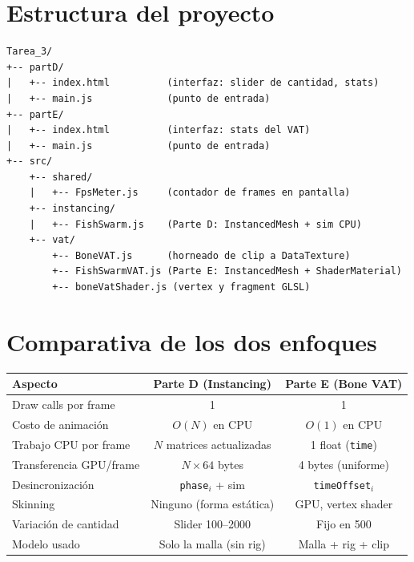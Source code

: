 \documentclass[12pt,a4paper]{article}
\begin{document}
\section{Estructura del proyecto}

\begin{verbatim}
Tarea_3/
+-- partD/
|   +-- index.html          (interfaz: slider de cantidad, stats)
|   +-- main.js             (punto de entrada)
+-- partE/
|   +-- index.html          (interfaz: stats del VAT)
|   +-- main.js             (punto de entrada)
+-- src/
    +-- shared/
    |   +-- FpsMeter.js     (contador de frames en pantalla)
    +-- instancing/
    |   +-- FishSwarm.js    (Parte D: InstancedMesh + sim CPU)
    +-- vat/
        +-- BoneVAT.js      (horneado de clip a DataTexture)
        +-- FishSwarmVAT.js (Parte E: InstancedMesh + ShaderMaterial)
        +-- boneVatShader.js (vertex y fragment GLSL)
\end{verbatim}

\section{Comparativa de los dos enfoques}

\begin{center}
\begin{tabular}{lcc}
  \toprule
  Aspecto & Parte D (Instancing) & Parte E (Bone VAT) \\
  \midrule
  Draw calls por frame    & 1                       & 1 \\
  Costo de animación      & $O(N)$ en CPU           & $O(1)$ en CPU \\
  Trabajo CPU por frame   & $N$ matrices actualizadas & 1 float (\texttt{time}) \\
  Transferencia GPU/frame & $N \times 64$ bytes      & 4 bytes (uniforme) \\
  Desincronización        & \texttt{phase}$_i$ + sim & \texttt{timeOffset}$_i$ \\
  Skinning                & Ninguno (forma estática) & GPU, vertex shader \\
  Variación de cantidad   & Slider 100--2000        & Fijo en 500 \\
  Modelo usado            & Solo la malla (sin rig) & Malla + rig + clip \\
  \bottomrule
\end{tabular}
\end{center}
\end{document}
